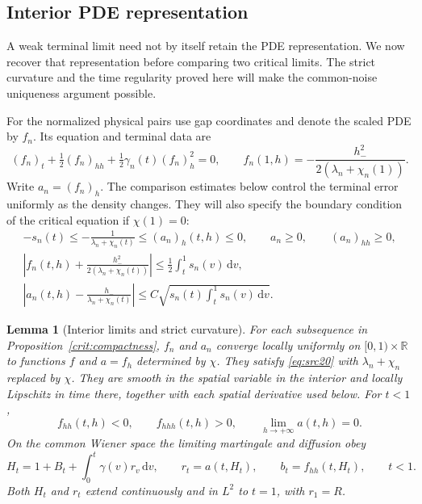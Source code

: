 \documentclass[11pt,a4paper]{article}
\numberwithin{equation}{section}
\newtheorem{lemma}[theorem]{Lemma}
\theoremstyle{definition}
\theoremstyle{remark}
\newcommand{\R}{\mathbb R}
\newcommand{\dd}{\mathrm d}
\begin{document}
\subsection{Interior PDE representation}

A weak terminal limit need not by itself retain the PDE representation.
We now recover that representation before comparing two critical limits.
The strict curvature and the time regularity proved here will make the
common-noise uniqueness argument possible.

For the normalized physical pairs use gap coordinates and denote the
scaled PDE by $f_n$.  Its equation and terminal data are
\[
 (f_n)_t+\tfrac12(f_n)_{hh}
               +\tfrac12\gamma_n(t)(f_n)_h^2=0,
 \qquad f_n(1,h)=-\frac{h_-^2}{2(\lambda_n+\chi_n(1))}.
\]
Write $a_n=(f_n)_h$.  The comparison estimates below control the terminal error uniformly as
the density changes. They will also specify the boundary condition of
the critical equation if $\chi(1)=0$:
\begin{equation}\label{eq:src20}
 \begin{gathered}
 -s_n(t)\le-\frac1{\lambda_n+\chi_n(t)}
                      \le (a_n)_h(t,h)\le0,
 \qquad a_n\ge0,\qquad (a_n)_{hh}\ge0,\\
 \left|f_n(t,h)+\frac{h_-^2}{2(\lambda_n+\chi_n(t))}\right|
                          \le\frac12\int_t^1s_n(v)\,\dd v,\\
 \left|a_n(t,h)-\frac{h_-}{\lambda_n+\chi_n(t)}\right|
                          \le C\sqrt{s_n(t)\int_t^1s_n(v)\,\dd v}.
 \end{gathered}
\end{equation}

\begin{lemma}[Interior limits and strict curvature]\label{crit:pde}
For each subsequence in Proposition~\ref{crit:compactness}, $f_n$ and $a_n$
converge locally uniformly on $[0,1)\times\R$ to functions $f$ and $a=f_h$
determined by $\chi$.  They satisfy \eqref{eq:src20} with
$\lambda_n+\chi_n$ replaced by $\chi$.  They are smooth in the spatial
variable in the interior and locally Lipschitz in time there, together
with each spatial derivative used below.  For $t<1$,
\[
 f_{hh}(t,h)<0,\qquad f_{hhh}(t,h)>0,
 \qquad \lim_{h\to+\infty}a(t,h)=0.
\]
On the common Wiener space the limiting martingale and diffusion obey
\begin{equation}\label{eq:src21}
 H_t=1+B_t+\int_0^t\gamma(v)r_v\,\dd v,
 \qquad r_t=a(t,H_t),\qquad b_t=f_{hh}(t,H_t),\qquad t<1.
\end{equation}
Both $H_t$ and $r_t$ extend continuously and in $L^2$ to $t=1$, with
$r_1=R$.
\end{lemma}
\end{document}
